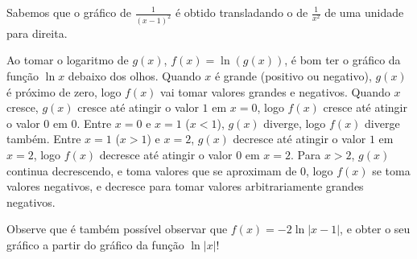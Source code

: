 \begin{Solution}{3.16}
Sabemos que o gráfico de $\frac{1}{(x-1)^2}$ é obtido transladando o de
$\frac{1}{x^2}$ de uma unidade para direita.
\begin{center}
\begin{bmlimage}\end{bmlimage}
\end{center}
Ao tomar o logaritmo de $g(x)$, $f(x)=\ln(g(x))$, é bom ter o gráfico da função
$\ln x$ debaixo dos olhos.
Quando $x$ é grande (positivo ou negativo),
$g(x)$ é próximo de zero, logo $f(x)$ vai tomar valores grandes e negativos.
Quando $x$ cresce, $g(x)$ cresce até atingir o valor $1$ em $x=0$, logo $f(x)$
cresce até atingir o valor $0$ em $0$. Entre $x=0$ e $x=1$ ($x<1$), $g(x)$
diverge, logo $f(x)$ diverge também.
Entre $x=1$ ($x>1$) e $x=2$, $g(x)$ decresce até atingir o valor $1$ em $x=2$,
logo $f(x)$ decresce até atingir o valor $0$ em $x=2$.
Para $x>2$, $g(x)$ continua decrescendo, e toma valores que se aproximam de $0$,
logo $f(x)$ se toma valores negativos, e decresce para tomar valores
arbitrariamente grandes negativos.
\begin{center}
\begin{bmlimage}\end{bmlimage}
\end{center}
Observe que é também possível observar que $f(x)=-2\ln|x-1|$, e obter o seu
gráfico a partir do gráfico da função $\ln |x|$!

\end{Solution}
